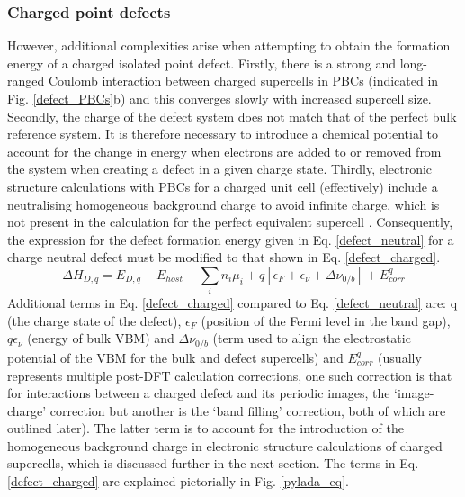 \documentclass[11pt, twoside]{report}
\begin{document}
\subsubsection{Charged point defects}
However, additional complexities arise when attempting to obtain the formation energy of a charged isolated point defect. Firstly, there is a strong and long-ranged Coulomb interaction between charged supercells in PBCs (indicated in Fig. \ref{defect_PBCs}b) and this converges slowly with increased supercell size.
Secondly, the charge of the defect system does not match that of the perfect bulk reference system. It is therefore necessary to introduce a chemical potential to account for the change in energy when electrons are added to or removed from the system when creating a defect in a given charge state.
Thirdly, electronic structure calculations with PBCs for a charged unit cell (effectively) include a neutralising homogeneous background charge to avoid infinite charge, which is not present in the calculation for the perfect equivalent supercell \cite{freysoldt_rev}. Consequently, the expression for the defect formation energy given in Eq. \ref{defect_neutral} for a charge neutral defect must be modified to that shown in Eq. \ref{defect_charged}.
\begin{equation}\label{defect_charged}
\Delta H_{D,q} = E_{D,q} - E_{host} - \sum_i n_i \mu_i + q[\epsilon_F + \epsilon_{\nu} + \Delta \nu_{0/b}] + E^q_{corr}
\end{equation}
Additional terms in Eq. \ref{defect_charged} compared to Eq. \ref{defect_neutral} are: q (the charge state of the defect), $\epsilon_F$ (position of the Fermi level in the band gap),  $q \epsilon_{\nu}$ (energy of bulk VBM) and $\Delta \nu_{0/b}$ (term used to align the electrostatic potential of the VBM for the bulk and defect supercells) and $E^q_{corr}$ (usually represents multiple post-DFT calculation corrections, one such correction is that for interactions between a charged defect and its periodic images, the `image-charge' correction but another is the `band filling' correction, both of which are outlined later). The latter term is to account for the introduction of the homogeneous background charge in electronic structure calculations of charged supercells, which is discussed further in the next section. The terms in Eq. \ref{defect_charged} are explained pictorially in Fig. \ref{pylada_eq}.
\end{document}
